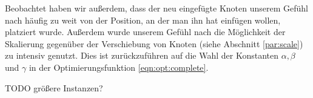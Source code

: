 Beobachtet haben wir außerdem, dass der neu eingefügte Knoten unserem Gefühl nach häufig zu weit von der Position, an der man ihn hat einfügen wollen, platziert wurde. Außerdem wurde unserem Gefühl nach die Möglichkeit der Skalierung gegenüber der Verschiebung von Knoten (siehe Abschnitt \ref{par:scale}) zu intensiv genutzt. Dies ist zurückzuführen auf die Wahl der Konstanten $\alpha, \beta$ und $\gamma$ in der Optimierungsfunktion \ref{eqn:opt:complete}.



TODO größere Instanzen?
